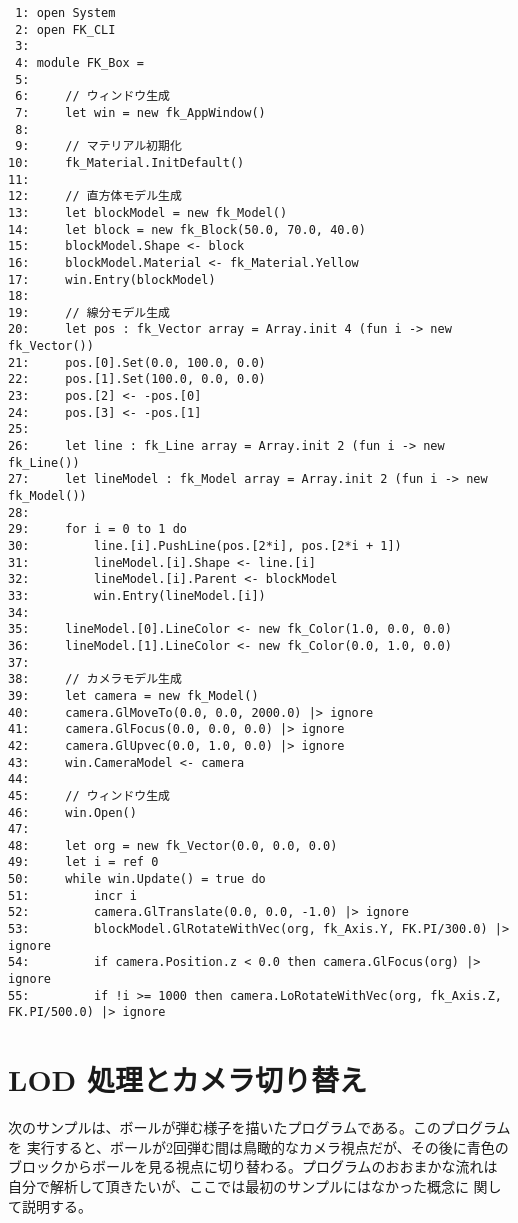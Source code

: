 \begin{breakbox}
\begin{small}
\begin{verbatim}
 1: open System
 2: open FK_CLI
 3: 
 4: module FK_Box =
 5: 
 6:     // ウィンドウ生成
 7:     let win = new fk_AppWindow()
 8: 
 9:     // マテリアル初期化
10:     fk_Material.InitDefault()
11: 
12:     // 直方体モデル生成
13:     let blockModel = new fk_Model()
14:     let block = new fk_Block(50.0, 70.0, 40.0)
15:     blockModel.Shape <- block
16:     blockModel.Material <- fk_Material.Yellow
17:     win.Entry(blockModel)
18: 
19:     // 線分モデル生成
20:     let pos : fk_Vector array = Array.init 4 (fun i -> new fk_Vector())
21:     pos.[0].Set(0.0, 100.0, 0.0)
22:     pos.[1].Set(100.0, 0.0, 0.0)
23:     pos.[2] <- -pos.[0]
24:     pos.[3] <- -pos.[1]
25: 
26:     let line : fk_Line array = Array.init 2 (fun i -> new fk_Line())
27:     let lineModel : fk_Model array = Array.init 2 (fun i -> new fk_Model())
28: 
29:     for i = 0 to 1 do
30:         line.[i].PushLine(pos.[2*i], pos.[2*i + 1])
31:         lineModel.[i].Shape <- line.[i]
32:         lineModel.[i].Parent <- blockModel
33:         win.Entry(lineModel.[i])
34: 
35:     lineModel.[0].LineColor <- new fk_Color(1.0, 0.0, 0.0)
36:     lineModel.[1].LineColor <- new fk_Color(0.0, 1.0, 0.0)
37: 
38:     // カメラモデル生成
39:     let camera = new fk_Model()
40:     camera.GlMoveTo(0.0, 0.0, 2000.0) |> ignore
41:     camera.GlFocus(0.0, 0.0, 0.0) |> ignore
42:     camera.GlUpvec(0.0, 1.0, 0.0) |> ignore
43:     win.CameraModel <- camera
44: 
45:     // ウィンドウ生成
46:     win.Open()
47: 
48:     let org = new fk_Vector(0.0, 0.0, 0.0)
49:     let i = ref 0
50:     while win.Update() = true do
51:         incr i
52:         camera.GlTranslate(0.0, 0.0, -1.0) |> ignore
53:         blockModel.GlRotateWithVec(org, fk_Axis.Y, FK.PI/300.0) |> ignore
54:         if camera.Position.z < 0.0 then camera.GlFocus(org) |> ignore
55:         if !i >= 1000 then camera.LoRotateWithVec(org, fk_Axis.Z, FK.PI/500.0) |> ignore
\end{verbatim}
\end{small}
\end{breakbox}

\section{LOD 処理とカメラ切り替え}
次のサンプルは、ボールが弾む様子を描いたプログラムである。このプログラムを
実行すると、ボールが2回弾む間は鳥瞰的なカメラ視点だが、その後に青色の
ブロックからボールを見る視点に切り替わる。プログラムのおおまかな流れは
自分で解析して頂きたいが、ここでは最初のサンプルにはなかった概念に
関して説明する。

